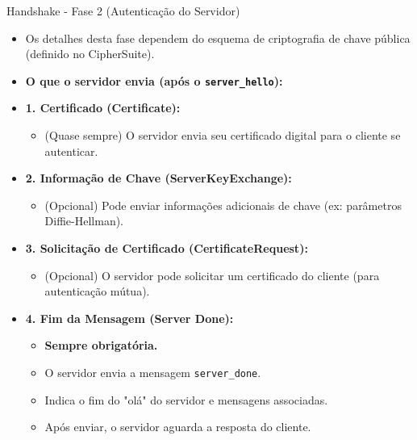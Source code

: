 \begin{frame}{Handshake - Fase 2 (Autenticação do Servidor)}
    \begin{itemize}
        \item Os detalhes desta fase dependem do esquema de criptografia de chave pública (definido no CipherSuite).

        \item \textbf{O que o servidor envia (após o \texttt{server\_hello}):}

        \item \textbf{1. Certificado (Certificate):}
              \begin{itemize}
                  \item (Quase sempre) O servidor envia seu certificado digital para o cliente se autenticar.
              \end{itemize}

        \item \textbf{2. Informação de Chave (ServerKeyExchange):}
              \begin{itemize}
                  \item (Opcional) Pode enviar informações adicionais de chave (ex: parâmetros Diffie-Hellman).
              \end{itemize}

        \item \textbf{3. Solicitação de Certificado (CertificateRequest):}
              \begin{itemize}
                  \item (Opcional) O servidor pode solicitar um certificado do cliente (para autenticação mútua).
              \end{itemize}

        \item \textbf{4. Fim da Mensagem (Server Done):}
              \begin{itemize}
                  \item \textbf{Sempre obrigatória.}
                  \item O servidor envia a mensagem \texttt{server\_done}.
                  \item Indica o fim do "olá" do servidor e mensagens associadas.
                  \item Após enviar, o servidor aguarda a resposta do cliente.
              \end{itemize}
    \end{itemize}
\end{frame}

